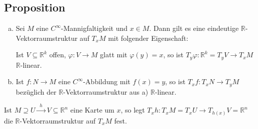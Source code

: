 \subsection[Proposition: Vektorraumstruktur von $T_x M$, Linearität der Tangentialabbildung]{Proposition} %
\label{sub:1813}
\begin{enumerate}[a)]
	\item Sei $M$ eine $C^\infty$-Mannigfaltigkeit und $x \in M$. Dann gilt es eine eindeutige $\mathds{R}$-Vektorraumstruktur auf $T_x M$ mit folgender
	Eigenschaft:
	
	Ist $V \subseteq \mathds{R}^k$ offen, $\varphi : V \to M$ glatt mit $\varphi(y)=x$, so ist 
	\(
		T_y \varphi : \mathds{R}^k = T_y V \to T_x M
	\)
	$\mathds{R}$-linear.
	\item Ist $f : N \to M$ eine $C^\infty$-Abbildung mit $f(x)=y$, so ist $T_x f : T_x N \to T_{y} M$ bezüglich der $\mathds{R}$-Vektorraumstruktur aus a) 
	$\mathds{R}$-linear.
\end{enumerate}
Ist $M \supseteq U \xrightarrow{\enspace h \enspace} V \subseteq \mathds{R}^n $ eine Karte um $x$, so  legt $T_x h : T_x M = T_x U \to T_{h(x)}V = \mathds{R}^n$ die
$\mathds{R}$-Vektorraumstruktur auf $T_x M$ fest.
